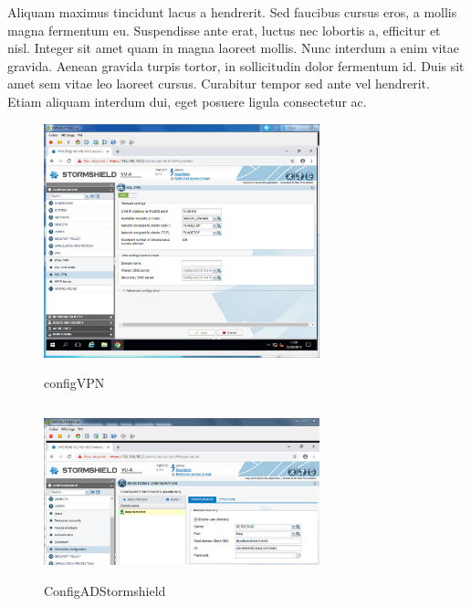 \documentclass{report}
\begin{document}
Aliquam maximus tincidunt lacus a hendrerit. Sed faucibus cursus eros, a mollis magna fermentum eu. Suspendisse ante erat, luctus nec lobortis a, efficitur et nisl. Integer sit amet quam in magna laoreet mollis. Nunc interdum a enim vitae gravida. Aenean gravida turpis tortor, in sollicitudin dolor fermentum id. Duis sit amet sem vitae leo laoreet cursus. Curabitur tempor sed ante vel hendrerit. Etiam aliquam interdum dui, eget posuere ligula consectetur ac.
\\
\begin{figure}[!ht]
\begin{minipage}[t]{.46\linewidth}
\centering\includegraphics[width=8cm]{./images/images/configVPN}
\caption{configVPN}
\end{minipage}
\begin{minipage}[t]{.60\linewidth}
\centering\includegraphics[width=8cm, height=5cm]{./images/images/ConfigADStormshield}
\caption{ConfigADStormshield}
\end{minipage}
\end{figure}
\end{document}
